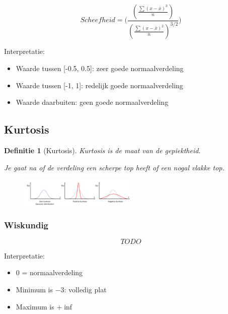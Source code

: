 \documentclass{article}
\newtheorem{theorem}{Definitie}[section]
\begin{document}
\begin{equation}
    Scheefheid = \Bigg(\frac{(\frac{\sum(x - \bar{x})^3}{n})}{(\frac{\sum(x - \bar{x})^2}{n})^{3/2}}\Bigg)
\end{equation}

Interpretatie:

\begin{itemize}
    \item Waarde tussen [-0.5, 0.5]: zeer goede normaalverdeling
    \item Waarde tussen [-1, 1]: redelijk goede normaalverdeling
    \item Waarde daarbuiten: geen goede normaalverdeling
\end{itemize}

\subsection{Kurtosis}

\begin{theorem}[Kurtosis]
    Kurtosis is de maat van de gepiektheid. 

    Je gaat na of de verdeling een scherpe top heeft of een nogal vlakke top.
\end{theorem}

\begin{figure}[H]
    \centering
    \includegraphics[width=0.5\textwidth]{kurtosis.png}
    \caption{}
\end{figure}

\subsubsection{Wiskundig}

\begin{equation}
    TODO    
\end{equation}



Interpretatie:

\begin{itemize}
    \item $0$ = normaalverdeling
    \item Minimum is $-3$: volledig plat
    \item Maximum is $+\inf$
\end{itemize}
\end{document}

